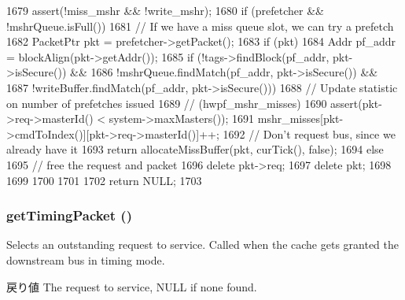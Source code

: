 \begin{DoxyCode}
{1679     assert(!miss_mshr && !write_mshr);
1680     if (prefetcher && !mshrQueue.isFull()) {
1681         // If we have a miss queue slot, we can try a prefetch
1682         PacketPtr pkt = prefetcher->getPacket();
1683         if (pkt) {
1684             Addr pf_addr = blockAlign(pkt->getAddr());
1685             if (!tags->findBlock(pf_addr, pkt->isSecure()) &&
1686                 !mshrQueue.findMatch(pf_addr, pkt->isSecure()) &&
1687                 !writeBuffer.findMatch(pf_addr, pkt->isSecure())) {
1688                 // Update statistic on number of prefetches issued
1689                 // (hwpf_mshr_misses)
1690                 assert(pkt->req->masterId() < system->maxMasters());
1691                 mshr_misses[pkt->cmdToIndex()][pkt->req->masterId()]++;
1692                 // Don't request bus, since we already have it
1693                 return allocateMissBuffer(pkt, curTick(), false);
1694             } else {
1695                 // free the request and packet
1696                 delete pkt->req;
1697                 delete pkt;
1698             }
1699         }
1700     }
1701 
1702     return NULL;
1703 }
\end{DoxyCode}
\hypertarget{classCache_a52bd0127c43c9167c1d092fc060cc472}{
\subsubsection[{getTimingPacket}]{ getTimingPacket ()}}
\label{classCache_a52bd0127c43c9167c1d092fc060cc472}
Selects an outstanding request to service. Called when the cache gets granted the downstream bus in timing mode. \begin{DoxyReturn}{戻り値}
The request to service, NULL if none found. 
\end{DoxyReturn}



